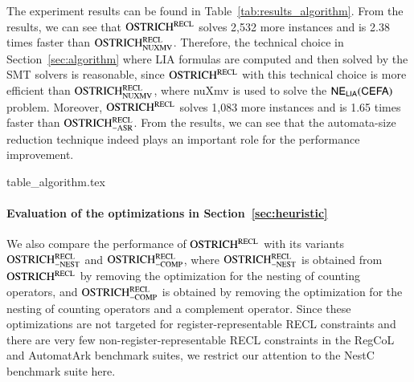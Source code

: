The experiment results can be found in Table~\ref{tab:results_algorithm}. From the results, we can see that $\rm OSTRICH^{RECL}$ solves 2,532 more instances and is 2.38 times faster than $\rm OSTRICH^{RECL}_{\rm NUXMV}$. 
Therefore, the technical choice in Section~\ref{sec:algorithm} where LIA formulas are computed and then solved by the SMT solvers is reasonable, since $\rm OSTRICH^{RECL}$ with this technical choice is more efficient than $\rm OSTRICH^{RECL}_{\rm NUXMV}$, where nuXmv is used to solve the ${\sf NE_{LIA}(CEFA)}$ problem. 
%
Moreover, $\rm OSTRICH^{RECL}$ solves 1,083 more instances and is 1.65 times faster than $\rm OSTRICH^{RECL}_{\rm -ASR}$. 
From the results, we can see that the automata-size reduction technique indeed plays an important role for the performance improvement. 

\begin{table}[htbp]
  {table_algorithm.tex}
  \caption{Evaluation of the technical choices and optimizations in Section~\ref{sec:algorithm}}\label{tab:results_algorithm}
\end{table}


\paragraph*{Evaluation of the optimizations in Section~\ref{sec:heuristic}}
%
We also compare the performance of $\rm OSTRICH^{RECL}$ with its variants $\rm OSTRICH^{RECL}_{\rm -NEST}$ and $\rm OSTRICH^{RECL}_{\rm -COMP}$, where $\rm OSTRICH^{RECL}_{\rm -NEST}$ is obtained from $\rm OSTRICH^{RECL}$ by removing the optimization for the nesting of counting operators, and $\rm OSTRICH^{RECL}_{\rm -COMP}$ is obtained by removing the optimization for the nesting of counting operators and a complement operator. Since these optimizations are not targeted for register-representable RECL constraints and there are very few non-register-representable RECL constraints in the RegCoL and AutomatArk benchmark suites, we restrict our attention to the NestC benchmark suite here. 

